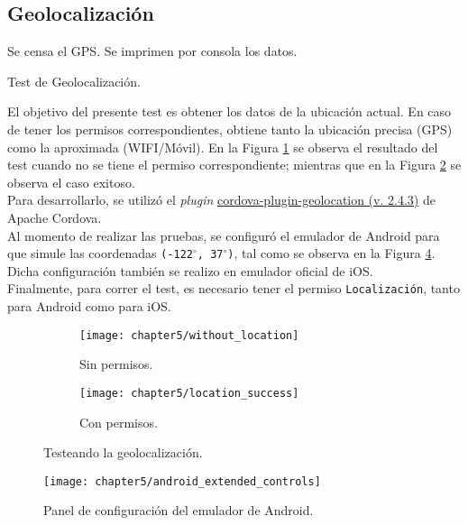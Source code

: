 \subsection{Geolocalización}
\begin{algorithm}
	\begin{algorithmic}[1]
		\STATE Se censa el GPS.
		\STATE Se imprimen por consola los datos.
	\end{algorithmic}
	\caption{Test de Geolocalización.}\label{alg:chap5:test_geolocalizacion}
\end{algorithm}
El objetivo del presente test es obtener los datos de la ubicación actual. En caso de tener los permisos correspondientes, obtiene tanto la ubicación precisa (GPS) como la aproximada (WIFI/Móvil). En la Figura \ref{fig:ch05:without_location} se observa el resultado del test cuando no se tiene el permiso correspondiente; mientras que en la Figura \ref{fig:ch05:with_location} se observa el caso exitoso.\\

Para desarrollarlo, se utilizó el \textit{plugin} \href{https://github.com/apache/cordova-plugin-geolocation}{cordova-plugin-geolocation (v. 2.4.3)} de Apache Cordova.\\

Al momento de realizar las pruebas, se configuró el emulador de Android para que simule las coordenadas \texttt{(-122$^\circ$, 37$^\circ$)}, tal como se observa en la Figura \ref{fig:ch05:android_extended_controls}. Dicha configuración también se realizo en emulador oficial de iOS.\\

Finalmente, para correr el test, es necesario tener el permiso \texttt{Localización}, tanto para Android como para iOS.
\begin{figure}[htbp]
    \centering
	\begin{subfigure}{0.3\linewidth}
		\texttt{[image: chapter5/without\_location]}
		\caption{Sin permisos.}
		\label{fig:ch05:without_location}
	\end{subfigure}
	\begin{subfigure}{0.3\linewidth}
		\texttt{[image: chapter5/location\_success]}
		\caption{Con permisos.}
		\label{fig:ch05:with_location}
	\end{subfigure}
	\caption{Testeando la geolocalización.}
	\label{fig:ch05:geolocation-cases}
\end{figure}
\begin{figure}[hbtp]
    \centering
	\texttt{[image: chapter5/android\_extended\_controls]}
	\caption{Panel de configuración del emulador de Android.}
	\label{fig:ch05:android_extended_controls}
\end{figure}
\newpage
